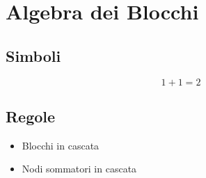 \section{Algebra dei Blocchi}
	\subsection{Simboli}
		\begin{figure}[H]
			\centering
			\begin{subfigure}{0.4\textwidth}
			\end{subfigure}
			\begin{subfigure}{0.4\textwidth}
				\[
				1+1=2
				\]
			\end{subfigure}
		\end{figure}
	\subsection{Regole}
	\begin{itemize}
		\item Blocchi in cascata
		\item Nodi sommatori in cascata
	\end{itemize}
		